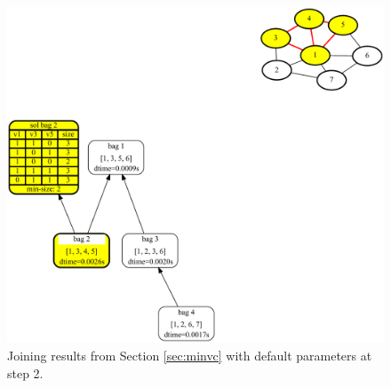 \documentclass[a4paper, 12pt, bibliography=totoc]{scrartcl}
\begin{document}
\begin{figure}[H]
	\centering
	\includegraphics[width=\linewidth,height=0.6\textheight,keepaspectratio]{images/SVGJOIN/default2.pdf}
	\caption{Joining results from Section \ref{sec:minvc} with default parameters at step 2.}
	\label{fig:joindefault}
\end{figure}
\end{document}
